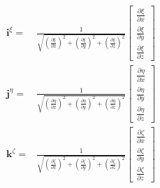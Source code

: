 \documentclass
[
a4paper,                      %
twoside,					  %
12pt,                         %
abstract,		      %
fleqn,                        %
]
{scrartcl} %
\begin{document}
\begin{equation}
\begin{aligned}
\mathbf{i}^{\xi}=&\frac{1}{\sqrt{\left(\frac{\partial\xi}{\partial x}\right)^{2}+\left(\frac{\partial\xi}{\partial y}\right)^{2}+\left(\frac{\partial\xi}{\partial z}\right)^{2}}}\begin{bmatrix}
\frac{\partial\xi}{\partial x}\\[5pt]
\frac{\partial\xi}{\partial y}\\[5pt]
\frac{\partial\xi}{\partial z}\end{bmatrix}\\
\mathbf{j}^{\eta}=&\frac{1}{\sqrt{\left(\frac{\partial\eta}{\partial x}\right)^{2}+\left(\frac{\partial\eta}{\partial y}\right)^{2}+\left(\frac{\partial\eta}{\partial z}\right)^{2}}}\begin{bmatrix}
\frac{\partial\eta}{\partial x}\\[5pt]
\frac{\partial\eta}{\partial y}\\[5pt]
\frac{\partial\eta}{\partial z}\end{bmatrix}\\
\mathbf{k}^{\zeta}=&\frac{1}{\sqrt{\left(\frac{\partial\zeta}{\partial x}\right)^{2}+\left(\frac{\partial\zeta}{\partial y}\right)^{2}+\left(\frac{\partial\zeta}{\partial z}\right)^{2}}}\begin{bmatrix}
\frac{\partial\zeta}{\partial x}\\[5pt]
\frac{\partial\zeta}{\partial y}\\[5pt]
\frac{\partial\zeta}{\partial z}
\end{bmatrix}
\end{aligned}
\end{equation}
\end{document}
